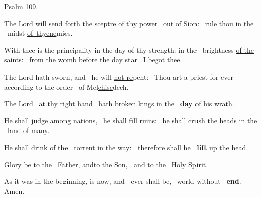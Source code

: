 \documentclass[12pt]{article} %
\def\noinitial{%
\gresetfirstlineaboveinitial{\textcolor{benred8}{\small \textsc{\textbf{}}}}{\textcolor{benred8}{\small \textsc{\textbf{}}}}
\setspaceafterinitial{0pt plus 0em minus 0em}%
\setspacebeforeinitial{0pt plus 0em minus 0em}%
\relax %
}
\newenvironment{psalmtext}{\leftskip 0.25in}{\vspace{1 mm}}
\def\pipe{\textcolor{benred8}{\textdoublepipe}}
\let\oldgresixstar\gresixstar
\renewcommand{\gresixstar}{\textcolor{benred8}{\oldgresixstar}}
\begin{document}
\begin{pages}
\begin{Rightside}
{}

\pend\pstart

{
\centering
\textcolor{benred8}{Psalm 109.}

}

\pend\pstart

\begin{psalmtext}


The Lord will send forth the sceptre of thy power \pipe\ out of Sion: \gresixstar\ rule thou in the \pipe\ midst \uline{of~thy}\hspace{2mm}\uline{ene}mies.

With thee is the principality in the day of thy strength: in the \pipe\ brightness \uline{of the} saints: \gresixstar\ from the womb before the day star \pipe\ I begot thee.

The Lord hath sworn, and \pipe\ he will \uline{not re}pent: \gresixstar\ Thou art a priest for ever according to the order \pipe\ of Mel\uline{chise}dech.

The Lord \pipe\ at thy right hand \gresixstar\ hath broken kings in the \pipe\ \textbf{day} \uline{of his} wrath.

He shall judge among nations, \pipe\ he \uline{shall fill} ruins: \gresixstar\ he shall crush the heads in the \pipe\ land of many.

He shall drink of the \pipe\ torrent \uline{in the} way: \gresixstar\ therefore shall he \pipe\ \textbf{lift} \uline{up the} head.

Glory be to the \pipe\ Fa\uline{ther, and}\hspace{2mm}\uline{to the} Son, \gresixstar\ and to the \pipe\ Holy Spirit.

As it was in the beginning, is now, and \pipe\ ever shall be, \gresixstar\ world without \pipe\ \textbf{end}. Amen.

\end{psalmtext}

\pend\pstart

{\noinitial
{}
}

\pend\pstart




\end{Rightside}
\end{pages}
\end{document}
